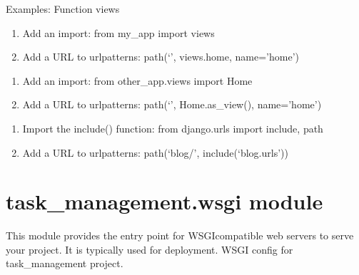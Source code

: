 \documentclass[letterpaper,10pt,english]{sphinxmanual}
\begin{document}
\sphinxAtStartPar
Examples:
Function views
\begin{enumerate}
%
\item {} 
\sphinxAtStartPar
Add an import:  from my\_app import views

\item {} 
\sphinxAtStartPar
Add a URL to urlpatterns:  path(‘’, views.home, name=’home’)

\end{enumerate}
\begin{description}
\begin{enumerate}
%
\item {} 
\sphinxAtStartPar
Add an import:  from other\_app.views import Home

\item {} 
\sphinxAtStartPar
Add a URL to urlpatterns:  path(‘’, Home.as\_view(), name=’home’)

\end{enumerate}

\begin{enumerate}
%
\item {} 
\sphinxAtStartPar
Import the include() function: from django.urls import include, path

\item {} 
\sphinxAtStartPar
Add a URL to urlpatterns:  path(‘blog/’, include(‘blog.urls’))

\end{enumerate}

\end{description}


\section{task\_management.wsgi module}
\label{\detokenize{task_management:task-management-wsgi-module}}
\sphinxAtStartPar
This module provides the entry point for WSGI\sphinxhyphen{}compatible web servers to serve your project. It is typically used for deployment.
\label{\detokenize{task_management:module-task_management.wsgi}}
\sphinxAtStartPar
WSGI config for task\_management project.
\end{document}
